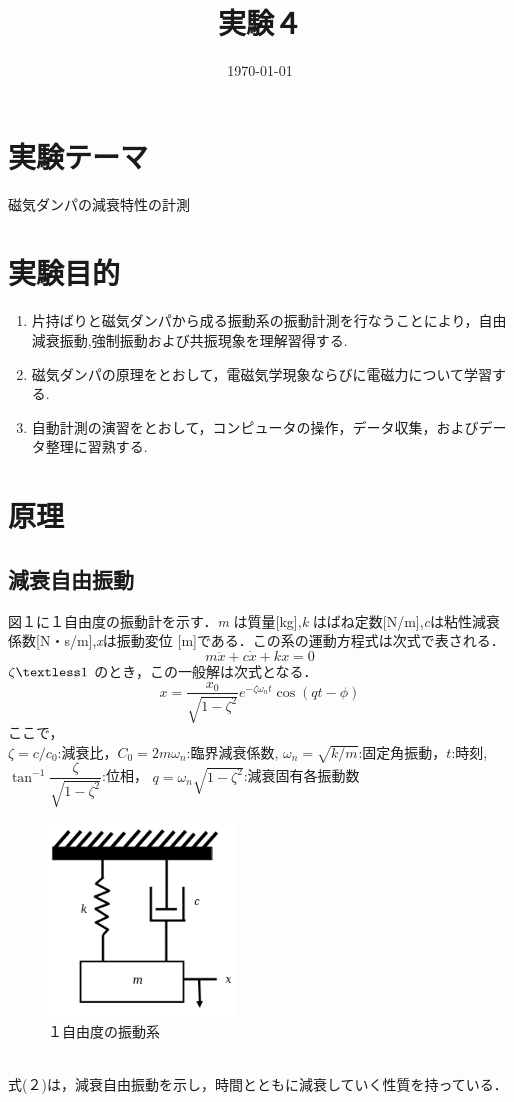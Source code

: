 \documentclass[a4paper,10.5pt]{jsarticle}
\title{実験４}
\author{\rightline{4s 30 野口 史遠}}
\date{\today}
\begin{document}
\section{実験テーマ}
磁気ダンパの減衰特性の計測

\section{実験目的}
\begin{enumerate}
  \item 片持ばりと磁気ダンパから成る振動系の振動計測を行なうことにより，自由減衰振動,強制振動および共振現象を理解習得する.
  \item 磁気ダンパの原理をとおして，電磁気学現象ならびに電磁力について学習する.
  \item 自動計測の演習をとおして，コンピュータの操作，データ収集，およびデータ整理に習熟する.
\end{enumerate}

\section{原理}
\subsection{減衰自由振動}
図１に１自由度の振動計を示す．\textsl{m} は質量[kg],\textsl{k}
はばね定数[N/m],\textsl{c}は粘性減衰係数[N・s/m],\textsl{x}は振動変位
[m]である．この系の運動方程式は次式で表される．
\begin{equation}
  m\ddot{x}+c\dot{x}+kx = 0
\end{equation}
$\zeta\textless1$ のとき，この一般解は次式となる．
\begin{equation}
x = {\dfrac{x_0}{\sqrt{1-\zeta^2}}e^{-\zeta {\omega}_{n} t}\cos (qt-\phi)}
\end{equation}
ここで，\\
\quad $\zeta=c/{c}_{0}$:減衰比，${C}_{0}=2m{\omega}_{n}$:臨界減衰係数,
$\omega_n=\sqrt{k/m}$:固定角振動，$t$:時刻,\\
\quad $\tan^{-1}{\dfrac{\zeta}{\sqrt{1-\zeta^2}}}$:位相，
$q=\omega_n\sqrt{1-\zeta^2}$:減衰固有各振動数
\begin{figure}[h]
  \centering
  \includegraphics[width=5cm]{1.png}
  \caption{１自由度の振動系}
\end{figure}  
\\式(２)は，減衰自由振動を示し，時間とともに減衰していく性質を持っている．
\end{document}
